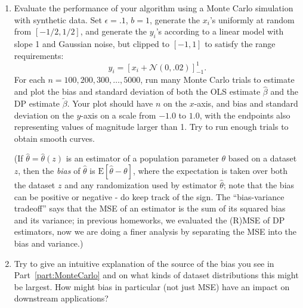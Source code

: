 \documentclass[11pt]{article}
\newcommand{\Exp}{\mathrm{E}}
\begin{document}
\begin{enumerate}[leftmargin=*]
\begin{enumerate}
    
    \item \label{part:MonteCarlo}
    Evaluate the performance of your
    algorithm using a Monte Carlo simulation with
    synthetic data.
    Set $\epsilon=.1$, $b=1$, generate the $x_i$'s uniformly at random from $[-1/2,1/2]$,
    and generate the $y_i$'s 
    according to a linear model with slope 1 and Gaussian noise, but clipped to $[-1,1]$ to satisfy the range requirements:
    $$y_i = \left[x_i + \mathcal{N}(0,.02)\right]_{-1}^1.$$
    For each $n=100,200,300,\ldots,5000$, run many Monte Carlo trials to estimate and plot the bias and standard deviation of both the OLS estimate $\hat{\beta}$ and the DP estimate $\tilde{\beta}$.  Your plot should have $n$ on the $x$-axis, and bias and standard deviation on the $y$-axis on a scale from $-1.0$ to $1.0$, with the endpoints also representing values of magnitude larger than 1.  Try to run enough trials to obtain smooth curves.
    
    (If $\hat{\theta}=\hat{\theta}(z)$ is an estimator of a  population parameter $\theta$ based on a dataset $z$, then the {\em bias} of $\hat{\theta}$ is $\Exp[\hat{\theta}-\theta]$, where the expectation is taken over both the dataset $z$ and any randomization used by estimator $\hat{\theta}$; note that the bias can be positive or negative - do keep track of the sign.  The ``bias-variance tradeoff'' says that the MSE of an estimator is the sum of its squared bias and its variance; in previous homeworks, we evaluated the (R)MSE of DP estimators, now we are doing a finer analysis by separating the MSE into the bias and variance.)
    
    \item Try to give an intuitive explanation of the source of the bias you see in 
    Part~\ref{part:MonteCarlo} and on what kinds of dataset distributions this might be largest.  How might bias in particular (not just MSE) have an impact on downstream applications?
    
\iffalse    Measure utility by the mean-squared residuals, as defined in Equation~(\ref{eqn:residuals}), but using your DP estimate for $\hat{\beta}$ instead of the OLS estimate.
    Plot and compare the distributions of mean-squared residuals you get with your differentially private simple linear regression versus with a non-private OLS regression.
\fi   
    \iffalse
    sum of the squared residuals
    Then use your implementation from part (a) to  show the utility for the slope and the intercept releases as a function of dataset size, over some reasonably chosen different values of $\epsilon$.
    \fi
    

\end{enumerate}
\end{enumerate}
\end{document}
